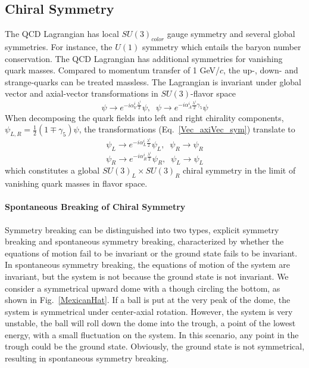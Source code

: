 \subsection{Chiral Symmetry}
The QCD Lagrangian has local $SU(3)_{color}$ gauge symmetry and several global symmetries. For instance,  the $U(1)$ symmetry which entails the baryon number conservation. The QCD Lagrangian has additional symmetries for vanishing quark masses. Compared to momentum transfer of 1 GeV/$c$, the up-, down- and strange-quarks can be treated massless. The Lagrangian is invariant under global vector and axial-vector transformations in $SU(3)$-flavor space
\begin{equation} 
\psi \rightarrow e^{-i\alpha^{i}_{V}\frac{\lambda^{i}}{2}}\psi,  \;\;  \psi \rightarrow e^{-i\alpha^{i}_{A}\frac{\lambda^{i}}{2}\gamma_{5}}\psi
\label{Vec_axiVec_sym}
\end{equation}
When decomposing the quark fields into left and right chirality components, $\psi_{L,R} = \frac{1}{2}(1\mp\gamma_{5})\psi$, the transformations (Eq.~\ref{Vec_axiVec_sym}) translate to 
\begin{equation} 
\psi_{L} \rightarrow e^{-i\alpha^{i}_{L}\frac{\lambda^{i}}{2}}\psi_{L},  \;\;  \psi_{R} \rightarrow \psi_{R}
\label{Left_sym}
\end{equation}
\begin{equation} 
\psi_{R} \rightarrow e^{-i\alpha^{i}_{R}\frac{\lambda^{i}}{2}}\psi_{R},  \;\;  \psi_{L} \rightarrow \psi_{L}
\label{Right_sym}
\end{equation}
which constitutes a global $SU(3)_{L} \times SU(3)_{R}$ chiral symmetry in the limit of vanishing quark masses in flavor space. 

\paragraph{Spontaneous Breaking of Chiral Symmetry}
Symmetry breaking can be distinguished into two types, explicit symmetry breaking and spontaneous symmetry breaking, characterized by whether the equations of motion fail to be invariant or the ground state fails to be invariant. In spontaneous symmetry breaking, the equations of motion of the system are invariant, but the system is not because the ground state is not invariant. We consider a symmetrical upward dome with a though circling the bottom, as shown in Fig.~\ref{MexicanHat}. If a ball is put at the very peak of the dome, the system is symmetrical under center-axial rotation. However, the system is very unstable, the ball will roll down the dome into the trough, a point of the lowest energy, with a small fluctuation on the system. In this scenario, any point in the trough could be the ground state. Obviously, the ground state is not symmetrical, resulting in spontaneous symmetry breaking.

